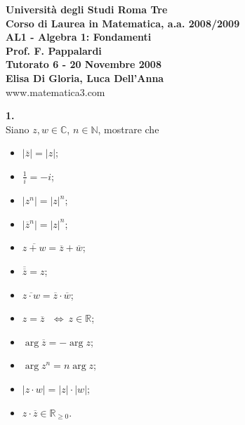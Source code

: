 \documentclass[italian,a4paper,11pt]
{article}
\newcommand{\R}{\mathbb{R}}
\newcommand{\N}{\mathbb{N}}
\newcommand{\C}{\mathbb{C}}
\begin{document}
\begin{center}


\textbf{Universit\`a degli Studi Roma Tre}\\

\textbf{Corso di Laurea in Matematica, a.a. 2008/2009}\\

\textbf{AL1 - Algebra 1: Fondamenti}\\

\textbf{Prof. F. Pappalardi}\\

\textbf{Tutorato 6 - 20 Novembre 2008}\\

\textbf{Elisa Di Gloria, Luca Dell'Anna}\\

www.matematica3.com\\
\end{center}



\vspace{0.5cm}




\noindent
\begin{Ex}\textbf{ 1.}\\
Siano $z,w\in \C$,  $n\in \N$, mostrare che
\begin{itemize}
	\item $|\overline{z}|=|z|$;
	\item $\frac{1}{i}=-i$;
	\item $|z^n|=|z|^n$;
	\item $|\overline{z}^n|=|z|^n$;
	\item $\overline{z+w}=\overline{z}+\overline{w}$;
	\item $\overline{\overline{z}}=z$;
	\item $\overline{z\cdot w}=\overline{z}\cdot \overline{w}$;
	\item $z=\overline{z}\ \ \ \iff \ z \in \R$;
	\item $\arg{\overline{z}}=- \arg{z}$;
	\item $\arg{z^n}=n\arg{z}$;
	\item $|z\cdot w|=|z|\cdot |w|$;
	\item $z\cdot \overline{z} \in \R_{\geq 0}$.
\end{itemize}
\end{Ex}
\end{document}
